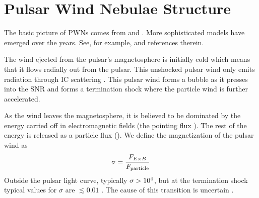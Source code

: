 \section{Pulsar Wind Nebulae Structure}


The basic picture of \acp{PWN}
comes from \cite{rees_1974_origin-magnetic} and
\cite{kennel_1984_magnetohydrodynamic-model}.  More 
sophisticated models have emerged over the years.  See, for example,
\cite{gelfand_2009_dynamical-model} and references therein.

The wind ejected from the pulsar's magnetosphere is initially
cold which means that it flows radially out from the pulsar.  This
unshocked pulsar wind only emits radiation through \ac{IC} scattering
\citep{bogovalov_2000_very-high-energy-gamma}.  This pulsar wind forms
a bubble as it presses into the \ac{SNR} and forms a termination shock
where the particle wind is further accelerated.

As the wind leaves the magnetosphere, it is believed to be dominated
by the energy carried off in electromagnetic fields (the pointing flux
\pointingflux).  The rest of the energy is released as a particle flux
(\particleflux).  We define the magnetization of the pulsar wind as
\begin{equation}
  \sigma = \frac{F_{E\times B}}{F_\text{particle}}
\end{equation}
Outside the pulsar light curve, typically $\sigma>10^4$, but
at the termination shock typical values for $\sigma$ are $\lesssim0.01$
\citep{kennel_1984a_confinement-pulsars}.  The cause of this transition
is uncertain \citep{gaensler_2006_evolution-structure}.

